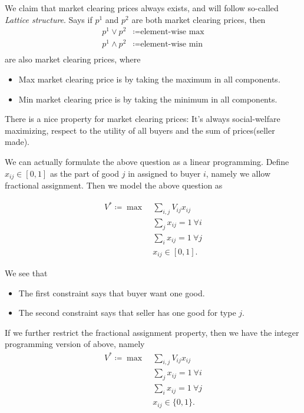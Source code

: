 We claim that market clearing prices always exists, and will follow so-called \emph{Lattice structure}. Says if
\(p^{1}\) and \(p^{2}\) are both market clearing prices, then
\[
	\begin{split}
		p^{1}\lor p^{2} &\coloneqq \text{element-wise max}\\
		p^{1}\land p^{2} &\coloneqq \text{element-wise min}\\
	\end{split}
\]
are also market clearing prices, where
\begin{itemize}
	\item Max market clearing price is by taking the maximum in all components.
	\item Min market clearing price is by taking the minimum in all components.
\end{itemize}


\begin{remark}
	There is a nice property for market clearing prices: It's always social-welfare maximizing, respect to the utility of all buyers
	and the sum of prices(seller made).
\end{remark}

We can actually formulate the above question as a linear programming. Define \(x_{ij} \in [0, 1]\) as the part of
good \(j\) in assigned to buyer \(i\), namely we allow fractional assignment. Then we model the above question as

\begin{align*}
	V^{\ast} \coloneqq \max~ & \sum\limits_{i, j}V_{ij}x_{ij}       \\
	                         & \sum\limits_{j}x_{ij} = 1\ \forall i \\
	                         & \sum\limits_{i}x_{ij} = 1\ \forall j \\
	                         & x_{ij}\in[0, 1].
\end{align*}
\begin{intuition}
	We see that
	\begin{itemize}
		\item The first constraint says that buyer want one good.
		\item The second constraint says that seller has one good for type \(j\).
	\end{itemize}
\end{intuition}

If we further restrict the fractional assignment property, then we have the integer programming version of above, namely
\begin{align*}
	V^{\ast} \coloneqq \max~ & \sum\limits_{i, j}V_{ij}x_{ij}       \\
	                         & \sum\limits_{j}x_{ij} = 1\ \forall i \\
	                         & \sum\limits_{i}x_{ij} = 1\ \forall j \\
	                         & x_{ij}\in\{0, 1\}.
\end{align*}

